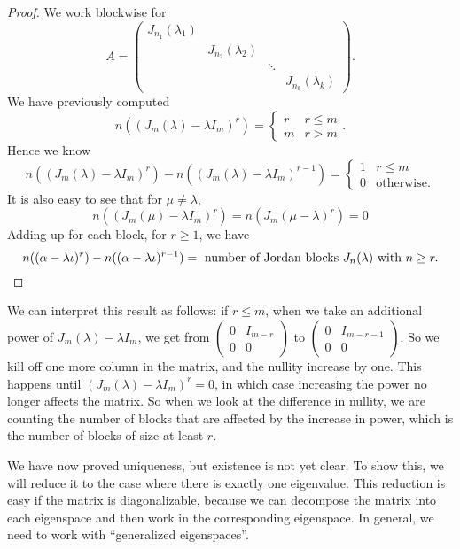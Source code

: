 \documentclass[a4paper]{article}
\begin{document}
\begin{proof}
  We work blockwise for
  \[
    A =
    \begin{pmatrix}
      J_{n_1}(\lambda_1)\\
      & J_{n_2}(\lambda_2)\\
      & & \ddots\\\
      & & & J_{n_k} (\lambda_k)
    \end{pmatrix}.
  \]
  We have previously computed
  \[
    n((J_m(\lambda) - \lambda I_m)^r) =
    \begin{cases}
      r & r \leq m\\
      m & r > m
    \end{cases}.
  \]
  Hence we know
  \[
    n((J_m(\lambda) - \lambda I_m)^r) - n((J_m(\lambda) - \lambda I_m)^{r - 1}) =
    \begin{cases}
      1 & r \leq m\\
      0 & \text{otherwise}.
    \end{cases}
  \]
  It is also easy to see that for $\mu \not= \lambda$,
  \[
    n((J_m(\mu) - \lambda I_m)^r) = n(J_m(\mu - \lambda)^r) = 0
  \]
  Adding up for each block, for $r \geq 1$, we have
  \[
    n((\alpha - \lambda \iota)^r) - n((\alpha - \lambda \iota)^{r - 1}) =\text{ number of Jordan blocks }J_n(\lambda)\text{ with } n \geq r.\qedhere
  \]
\end{proof}
We can interpret this result as follows: if $r \leq m$, when we take an additional power of $J_m(\lambda) - \lambda I_m$, we get from $\begin{pmatrix}0 & I_{m - r}\\ 0 & 0\end{pmatrix}$ to $\begin{pmatrix}0 & I_{m - r - 1}\\ 0 & 0\end{pmatrix}$. So we kill off one more column in the matrix, and the nullity increase by one. This happens until $(J_m(\lambda) - \lambda I_m)^r = 0$, in which case increasing the power no longer affects the matrix. So when we look at the difference in nullity, we are counting the number of blocks that are affected by the increase in power, which is the number of blocks of size at least $r$.

We have now proved uniqueness, but existence is not yet clear. To show this, we will reduce it to the case where there is exactly one eigenvalue. This reduction is easy if the matrix is diagonalizable, because we can decompose the matrix into each eigenspace and then work in the corresponding eigenspace. In general, we need to work with ``generalized eigenspaces''.
\end{document}
